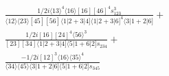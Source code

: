 \documentclass[varwidth, border=5pt]{standalone}
\begin{document}
\begin{my}
$\begin{gathered}
\scriptscriptstyle\frac{1/2i⟨13⟩^4⟨16⟩[16][46]^4s_{123}^3}{⟨12⟩⟨23⟩[45][56]⟨1|2+3|4]⟨1|2+3|6]^4⟨3|1+2|6]}+\\
\scriptscriptstyle\frac{1/2i[16][24]^4⟨56⟩^3}{[23][34]⟨1|2+3|4]⟨5|1+6|2]s_{234}}+\\
\scriptscriptstyle\frac{-1/2i[12]^3⟨16⟩⟨35⟩^4}{⟨34⟩⟨45⟩⟨3|1+2|6]⟨5|1+6|2]s_{345}}\phantom{+}
\end{gathered}$
\end{my}
\end{document}
